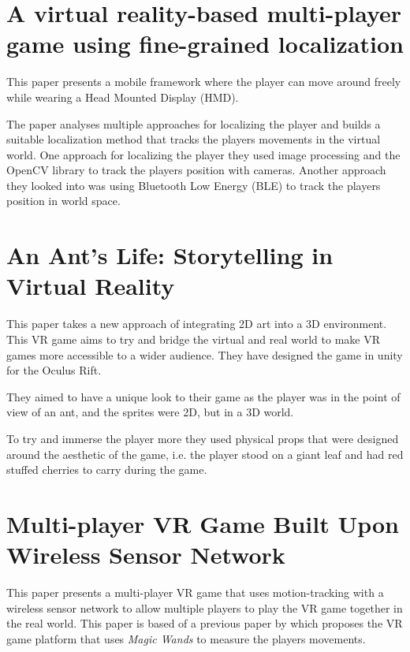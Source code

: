 \documentclass{scrartcl}
\begin{document}
\section{A virtual reality-based multi-player game using fine-grained localization \cite{de2015virtual}}
This paper presents a mobile framework where the player can move around freely while wearing a Head Mounted Display (HMD). 

The paper analyses multiple approaches for localizing the player and builds a suitable localization method that tracks the players movements in the virtual world. 
One approach for localizing the player they used image processing and the OpenCV library to track the players position with cameras. Another approach they looked into was using Bluetooth Low Energy (BLE) to track the players position in world space. 

\section{An Ant's Life: Storytelling in Virtual Reality \cite{Leo:2015}}
This paper takes a new approach of integrating 2D art into a 3D environment. This VR game aims to try and bridge the virtual and real world to make VR games more accessible to a wider audience.
They have designed the game in unity for the Oculus Rift.

They aimed to have a unique look to their game as the player was in the point of view of an ant, and the sprites were 2D, but in a 3D world. 

To try and immerse the player more they used physical props that were designed around the aesthetic of the game, i.e. the player stood on a giant leaf and had red stuffed cherries to carry during the game.

\section{ Multi-player VR Game Built Upon Wireless Sensor Network \cite{Jee:2008}}
This paper presents a multi-player VR game that uses motion-tracking with a wireless sensor network to allow multiple players to play the VR game together in the real world.
This paper is based of a previous paper by \cite{Eom:2006} which proposes the VR game platform that uses \textit{Magic Wands} to measure the players movements.



\end{document}
